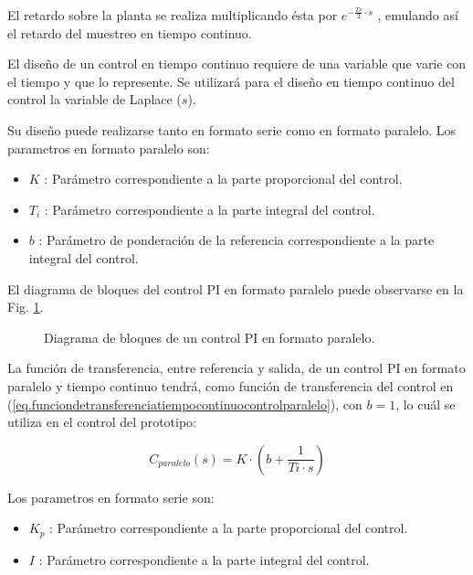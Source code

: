 \documentclass{report}
\begin{document}
El retardo sobre la planta se realiza multiplicando ésta por $e^{-\frac{Ts}{2} \cdot s}$ \cite{treintayseis}, emulando así el retardo del muestreo en tiempo continuo.

El diseño de un control en tiempo continuo requiere de una variable que varie con el tiempo y que lo represente. Se utilizará para el diseño en tiempo continuo del control la variable de Laplace ($s$). 

Su diseño puede realizarse tanto en formato serie como en formato paralelo. Los parametros en formato paralelo son:
\begin{itemize}
    \item $K$ : Parámetro correspondiente a la parte proporcional del control.
    \item $T_{i}$ : Parámetro correspondiente a la parte integral del control.
    \item $b$ : Parámetro de ponderación de la referencia correspondiente a la parte integral del control.
\end{itemize}

El diagrama de bloques del control PI en formato paralelo puede observarse en la Fig. \ref{fig.DiagramadebloquesControlPI}.
\begin{figure}[!h]
    \centering
    \caption{Diagrama de bloques de un control PI en formato paralelo.}
    \label{fig.DiagramadebloquesControlPI}
\end{figure} 

La función de transferencia, entre referencia y salida, de un control PI en formato paralelo y tiempo continuo tendrá, como función de transferencia del control en (\ref{eq.funciondetransferenciatiempocontinuocontrolparalelo}), con $b = 1$, lo cuál se utiliza en el control del prototipo:

\begin{equation}
    C_{paralelo}(s) = K\cdot (b + \frac{1}{Ti\cdot s}) \label{eq.funciondetransferenciatiempocontinuocontrolparalelo}
\end{equation}

Los parametros en formato serie son:
\begin{itemize}
    \item $K_{p}$  : Parámetro correspondiente a la parte proporcional del control.
    \item $I$ : Parámetro correspondiente a la parte integral del control.
\end{itemize}  
\end{document}
